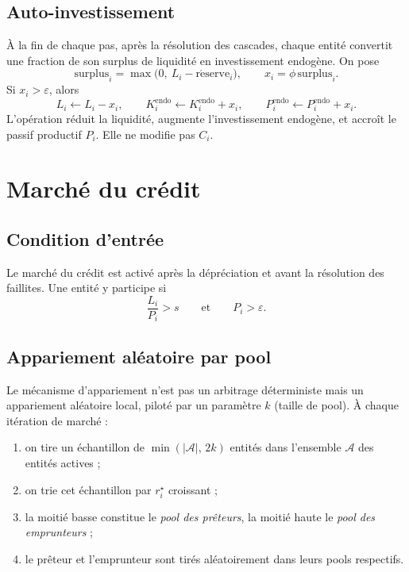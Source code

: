 \documentclass[11pt,a4paper]{article}
\begin{document}
\subsection{Auto-investissement}

À la fin de chaque pas, après la résolution des cascades, chaque entité convertit une fraction de son surplus de liquidité en investissement endogène. On pose
\[
\mathrm{surplus}_i = \max\!\bigl(0,\ L_i - \mathrm{r\acute eserve}_i\bigr),\qquad
x_i = \phi\,\mathrm{surplus}_i.
\]
Si \(x_i > \varepsilon\), alors
\[
L_i \leftarrow L_i - x_i,\qquad
K_i^{\mathrm{endo}} \leftarrow K_i^{\mathrm{endo}} + x_i,\qquad
P_i^{\mathrm{endo}} \leftarrow P_i^{\mathrm{endo}} + x_i.
\]
L'opération réduit la liquidité, augmente l'investissement endogène, et accroît le passif productif \(P_i\). Elle ne modifie pas \(C_i\).

\section{Marché du crédit}

\subsection{Condition d'entrée}

Le marché du crédit est activé après la dépréciation et avant la résolution des faillites. Une entité y participe si
\[
\frac{L_i}{P_i} > s \qquad\text{et}\qquad P_i > \varepsilon.
\]

\subsection{Appariement aléatoire par pool}

Le mécanisme d'appariement n'est pas un arbitrage déterministe mais un appariement aléatoire local, piloté par un paramètre \(k\) (taille de pool). À chaque itération de marché :

\begin{enumerate}
    \item on tire un échantillon de \(\min(|\mathcal A|,\,2k)\) entités dans l'ensemble \(\mathcal A\) des entités actives ;
    \item on trie cet échantillon par \(r_i^\star\) croissant ;
    \item la moitié basse constitue le \emph{pool des prêteurs}, la moitié haute le \emph{pool des emprunteurs} ;
    \item le prêteur et l'emprunteur sont tirés aléatoirement dans leurs pools respectifs.
\end{enumerate}
\end{document}
